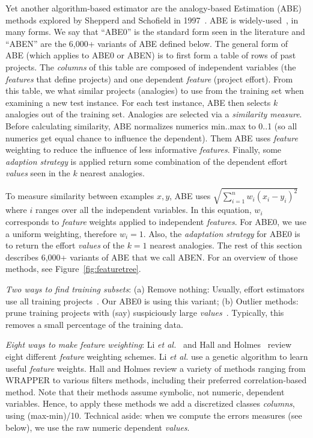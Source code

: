 \documentclass[10pt,conference]{IEEEtran}
\begin{document}
Yet another algorithm-based estimator are the 
analogy-based Estimation (ABE) methods explored by Shepperd and Schofield  in 1997~\cite{shepperd1997estimating}. ABE is widely-used~\cite{7194627,Kocaguneli2015,7426628,6092574,MenziesNeg:2017}, in many forms.
We  say that  ``ABE0'' is the standard  form  seen in the literature
and ``ABEN'' are the 6,000+ variants of ABE  defined below. 
The general form of ABE (which applies to  ABE0 or ABEN) is
to first form a table of rows of past projects. The {\em columns} of this table are composed of independent variables (the {\em features} that define projects) and one dependent {\em feature} (project  effort).
From this table, we   what  similar projects (analogies) to use from the training set when examining a new test instance.
For each test instance, ABE then selects   $k$ analogies out of the training set.
Analogies are selected via   a {\em similarity measure}. 
Before calculating similarity,  ABE normalizes   numerics  min..max to 0..1 (so all numerics   get equal chance to influence the dependent). 
Them ABE uses {\em feature} weighting to reduce the influence of less informative {\em features}.
Finally, some  {\em adaption strategy} is applied  return some combination of  the dependent effort {\em values} seen in  the $k$ nearest analogies.

To measure    similarity between examples $x,y$, 
ABE uses $\sqrt{\sum_{i=1}^n w_i(x_i-y_i)^2}$ where $i$ ranges
over all the independent variables. In this equation, $w_i$ corresponds to {\em feature} weights applied to independent {\em features}. For ABE0, we use a uniform weighting, therefore $w_i=1$.
Also,
the {\em adaptation strategy} for ABE0 is to return the  effort {\em values} of the $k=1$ nearest analogies.
The rest of this section describes 6,000+ variants of ABE that we call ABEN. For an overview of those methods, see Figure~\ref{fig:featuretree}.



{\em Two ways to find training subsets}:
(a) Remove nothing: Usually, effort estimators use all training projects~\cite{chang1974finding}. Our ABE0 is using this variant;
(b) Outlier methods: prune training projects with (say) suspiciously large {\em values}~\cite{keung2008analogy}. Typically, this removes a small percentage of the training data.

{\em Eight ways to make feature weighting}:
Li {\it et al.}~\cite{li2009study} and Hall and Holmes~\cite{hall2003benchmarking} review eight different {\em feature} weighting schemes. Li {\it et al.} use a genetic algorithm to learn useful {\em feature} weights. Hall and Holmes review a variety of methods ranging from WRAPPER to various filters methods, including their preferred correlation-based method. Note that their methods assume symbolic, not numeric, dependent variables. Hence, to apply these methods we add a discretized   classes {\em columns}, using (max-min)/10.  Technical aside: when we compute the errors measures (see below), we       use  the raw numeric dependent {\em values}.
\end{document}
